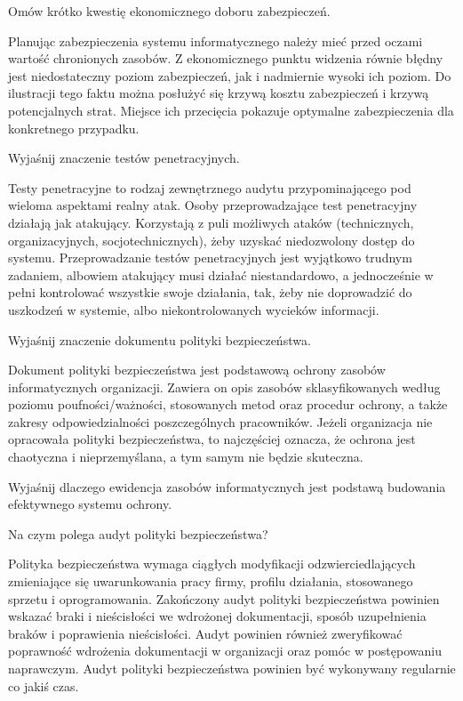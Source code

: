 \documentclass[answers,11pt]{exam}
\begin{document}
\begin{questions}

\question Omów krótko kwestię ekonomicznego doboru zabezpieczeń.
\begin{solution}
Planując zabezpieczenia systemu informatycznego należy mieć przed oczami wartość chronionych zasobów. Z ekonomicznego punktu widzenia równie błędny jest niedostateczny poziom zabezpieczeń, jak i nadmiernie wysoki ich poziom. Do ilustracji tego faktu można posłużyć się krzywą kosztu zabezpieczeń i krzywą potencjalnych strat. Miejsce ich przecięcia pokazuje optymalne zabezpieczenia dla konkretnego przypadku. 
\end{solution}

\question Wyjaśnij znaczenie testów penetracyjnych.
\begin{solution}
Testy penetracyjne to rodzaj zewnętrznego audytu przypominającego pod wieloma aspektami realny atak. Osoby przeprowadzające test penetracyjny działają jak atakujący. Korzystają z puli możliwych ataków (technicznych, organizacyjnych, socjotechnicznych), żeby uzyskać niedozwolony dostęp do systemu. Przeprowadzanie testów penetracyjnych jest wyjątkowo trudnym zadaniem, albowiem atakujący musi działać niestandardowo, a jednocześnie w pełni kontrolować wszystkie swoje działania, tak, żeby nie doprowadzić do uszkodzeń w systemie, albo niekontrolowanych wycieków informacji.
\end{solution}

\question Wyjaśnij znaczenie dokumentu polityki bezpieczeństwa.
\begin{solution}
Dokument polityki bezpieczeństwa jest podstawową ochrony zasobów informatycznych organizacji. Zawiera on opis zasobów sklasyfikowanych według poziomu poufności/ważności, stosowanych metod oraz procedur ochrony, a także zakresy odpowiedzialności poszczególnych pracowników. 
Jeżeli organizacja nie opracowała polityki bezpieczeństwa, to najczęściej oznacza, że ochrona jest chaotyczna i nieprzemyślana, a tym samym nie będzie skuteczna.
\end{solution}


\question Wyjaśnij dlaczego ewidencja zasobów informatycznych jest podstawą budowania efektywnego systemu ochrony.

\question Na czym polega audyt polityki bezpieczeństwa?
\begin{solution}
Polityka bezpieczeństwa wymaga ciągłych modyfikacji odzwierciedlających zmieniające się uwarunkowania pracy firmy, profilu działania, stosowanego sprzetu i oprogramowania. Zakończony audyt polityki bezpieczeństwa powinien wskazać braki i nieścisłości we wdrożonej dokumentacji, sposób uzupełnienia braków i poprawienia nieścisłości. Audyt powinien również zweryfikować poprawność wdrożenia dokumentacji w organizacji oraz pomóc w postępowaniu naprawczym. Audyt polityki bezpieczeństwa powinien być wykonywany regularnie co jakiś czas.
\end{solution}


\end{questions}
\end{document}
